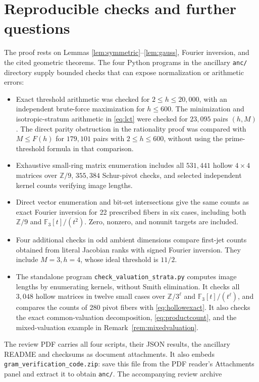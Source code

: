 \documentclass[11pt]{article}
\numberwithin{equation}{section}
\theoremstyle{remark}
\newcommand{\F}{\mathbb F}
\newcommand{\Z}{\mathbb Z}
\begin{document}
\section{Reproducible checks and further questions}
The proof rests on Lemmas \ref{lem:symmetric}--\ref{lem:gauss},
Fourier inversion, and the cited geometric theorems.
The four Python programs in the ancillary \texttt{anc/} directory
supply bounded checks
that can expose normalization or arithmetic errors:
\begin{itemize}
\item Exact threshold arithmetic was checked for $2\le h\le20{,}000$,
with an independent brute-force maximization for $h\le600$.
The minimization and isotropic-stratum arithmetic in
\eqref{eq:lct} were checked for $23{,}095$ pairs $(h,M)$.
The direct parity obstruction in the rationality proof was compared
with $M\le F(h)$ for $179{,}101$ pairs with $2\le h\le600$,
without using the prime-threshold formula in that comparison.
\item Exhaustive small-ring matrix enumeration includes all
$531{,}441$ hollow $4\times4$ matrices over $\Z/9$,
$355{,}384$ Schur-pivot checks, and selected independent
kernel counts verifying image lengths.
\item Direct vector enumeration and bit-set intersections give
the same counts as exact Fourier inversion for 22 prescribed
fibers in six cases, including both $\Z/9$ and
$\F_3[t]/(t^2)$. Zero, nonzero, and nonunit targets are included.
\item Four additional checks in odd ambient dimensions compare
first-jet counts obtained from literal Jacobian ranks with
signed Fourier inversion. They include $M=3,h=4$, whose
ideal threshold is $11/2$.
\item The standalone program \texttt{check\_valuation\_strata.py}
computes image lengths by enumerating kernels, without Smith
elimination. It checks all $3{,}048$ hollow matrices in twelve small
cases over $\Z/3^\ell$ and $\F_3[t]/(t^\ell)$, and compares
the counts of $280$ pivot fibers with \eqref{eq:hollowexact}.
It also checks the exact common-valuation decomposition,
\eqref{eq:productcount}, and the mixed-valuation example in
Remark~\ref{rem:mixedvaluation}.
\end{itemize}
The review PDF carries all four scripts, their JSON results, the
ancillary README and checksums as document attachments. It also embeds
\texttt{gram\_verification\_code.zip}: save this file from the PDF
reader's Attachments panel and extract it to obtain \texttt{anc/}.
The accompanying review archive
\end{document}
